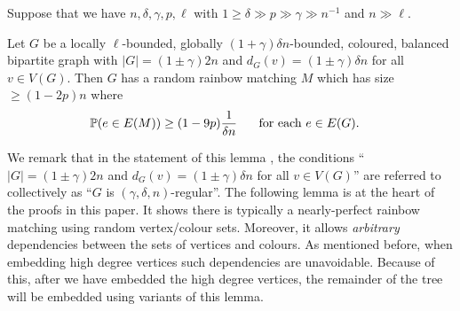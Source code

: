 \begin{lemma}\label{Lemma_MPS_nearly_perfect_matching}
Suppose that we have $n, \delta, \gamma, p, \ell$ with $1\geq \delta \gg  p \gg \gamma \gg n^{-1}$ and $n\gg \ell$.

Let $G$ be a locally $\ell$-bounded,  globally $(1+\gamma) \delta n$-bounded,  coloured, balanced bipartite graph with $|G|=(1\pm \gamma)2n$ and $d_G(v)=(1\pm \gamma)\delta n$ for all $v\in V(G)$. Then $G$ has  a random rainbow matching $M$ which has size $\geq (1-2p)n$ where
\begin{align}
\P(e\in E(M))&\geq(1-  9p)\frac{1}{\delta n}\hspace{0.5cm}\text{ for each $e\in E(G)$.} \label{Eq_Near_Matching_Edge_Probability_Lower_Bound}
\end{align}
\end{lemma}
We remark that in the statement of this lemma \cite{montgomery2018decompositions}, the conditions
``$|G|=(1\pm \gamma)2n$ and $d_G(v)=(1\pm \gamma)\delta n$ for all $v\in V(G)$'' are referred to collectively as ``$G$ is $(\gamma, \delta, n)$-regular''.
The following lemma is at the heart of the proofs in this paper. It shows there is typically a nearly-perfect rainbow matching using random vertex/colour sets. Moreover, it allows \emph{arbitrary} dependencies between the sets of vertices and colours. As mentioned before, when embedding high degree vertices such dependencies are unavoidable. Because of this, after we have embedded the high degree vertices, the remainder of the tree will be embedded using variants of this lemma.

